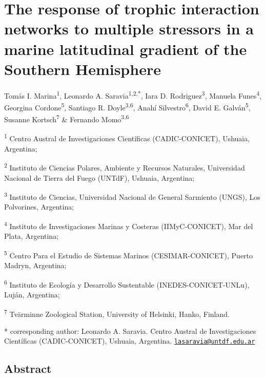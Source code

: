 \documentclass[
]{article}
\author{}
\date{\vspace{-2.5em}}
\begin{document}
\section{The response of trophic interaction networks to multiple
stressors in a marine latitudinal gradient of the Southern
Hemisphere}\label{the-response-of-trophic-interaction-networks-to-multiple-stressors-in-a-marine-latitudinal-gradient-of-the-southern-hemisphere}

Tomás I. Marina\textsuperscript{1}, Leonardo A.
Saravia\textsuperscript{1,2,*}, Iara D. Rodriguez\textsuperscript{3},
Manuela Funes\textsuperscript{4}, Georgina Cordone\textsuperscript{5},
Santiago R. Doyle\textsuperscript{3,6}, Anahí
Silvestro\textsuperscript{6}, David E. Galván\textsuperscript{5},
Susanne Kortsch\textsuperscript{7} \& Fernando Momo\textsuperscript{3,6}

\textsuperscript{1} Centro Austral de Investigaciones Científicas
(CADIC-CONICET), Ushuaia, Argentina;

\textsuperscript{2} Instituto de Ciencias Polares, Ambiente y Recursos
Naturales, Universidad Nacional de Tierra del Fuego (UNTdF), Ushuaia,
Argentina;

\textsuperscript{3} Instituto de Ciencias, Universidad Nacional de
General Sarmiento (UNGS), Los Polvorines, Argentina;

\textsuperscript{4} Instituto de Investigaciones Marinas y Costeras
(IIMyC-CONICET), Mar del Plata, Argentina;

\textsuperscript{5} Centro Para el Estudio de Sistemas Marinos
(CESIMAR-CONICET), Puerto Madryn, Argentina;

\textsuperscript{6} Instituto de Ecología y Desarrollo Sustentable
(INEDES-CONICET-UNLu), Luján, Argentina;

\textsuperscript{7} Tvärminne Zoological Station, University of
Helsinki, Hanko, Finland.

* corresponding author: Leonardo A. Saravia. Centro Austral de
Investigaciones Científicas (CADIC-CONICET), Ushuaia, Argentina.
\href{mailto:lasaravia@untdf.edu.ar}{\nolinkurl{lasaravia@untdf.edu.ar}}

\subsection{Abstract}\label{abstract}
\end{document}
